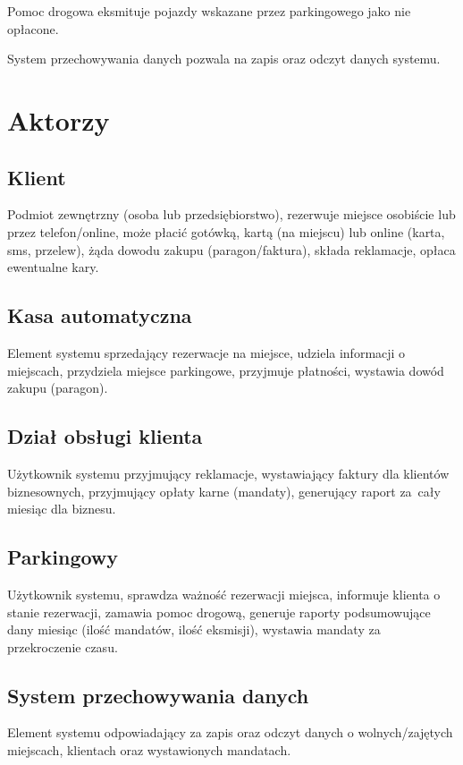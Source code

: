 Pomoc drogowa eksmituje pojazdy wskazane przez parkingowego jako nie opłacone.

System przechowywania danych pozwala na zapis oraz odczyt danych systemu.

\newpage
\section{Aktorzy}
\subsection{Klient}

Podmiot zewnętrzny (osoba lub przedsiębiorstwo), rezerwuje miejsce osobiście lub przez telefon/online, może płacić gotówką, kartą (na miejscu) lub online (karta, sms, przelew), żąda dowodu zakupu (paragon/faktura), składa reklamacje,  opłaca ewentualne kary.

\subsection{Kasa automatyczna}

Element systemu sprzedający rezerwacje na miejsce, udziela informacji o miejscach, przydziela miejsce parkingowe, przyjmuje płatności, wystawia dowód zakupu (paragon).

\subsection{Dział obsługi klienta}

Użytkownik systemu przyjmujący reklamacje, wystawiający faktury dla klientów biznesownych,  przyjmujący opłaty karne (mandaty), generujący raport za~cały miesiąc dla biznesu.

\subsection{Parkingowy}

Użytkownik systemu, sprawdza ważność rezerwacji miejsca, informuje klienta o stanie rezerwacji, zamawia pomoc drogową, generuje raporty podsumowujące dany miesiąc (ilość mandatów, ilość eksmisji), wystawia mandaty za przekroczenie czasu.

\subsection{System przechowywania danych}

Element systemu odpowiadający za zapis oraz odczyt danych o wolnych/zajętych miejscach, klientach oraz wystawionych mandatach.

